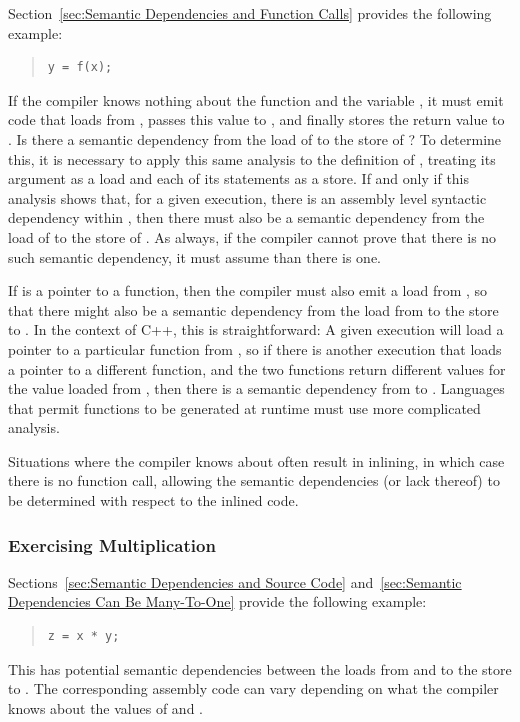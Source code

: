 Section~\ref{sec:Semantic Dependencies and Function Calls}
provides the following example:
\begin{quote}
\begin{verbatim}
y = f(x);
\end{verbatim}
\end{quote}
If the compiler knows nothing about the function  and the variable
, it must emit code that loads from , passes this value to
, and finally stores the return value to .
Is there a semantic dependency from the load of  to the store of
?
To determine this, it is necessary to apply this same analysis to the
definition of , treating its argument as a load and each of its
 statements as a store.
If and only if this analysis shows that, for a given execution, there
is an assembly level syntactic dependency within , then there
must also be a semantic dependency from the load of  to the store
of .
As always, if the compiler cannot prove that there is no such semantic
dependency, it must assume than there is one.

If  is a pointer to a function, then the compiler must also emit
a load from , so that there might also be a semantic dependency
from the load from  to the store to .
In the context of C++, this is straightforward:
A given execution will load a pointer to a particular function from
, so if there is another execution that loads a pointer to a
different function, and the two functions return different values for
the value loaded from , then there is a semantic dependency from
 to .
Languages that permit functions to be generated at runtime must use
more complicated analysis.

Situations where the compiler knows about  often result in
inlining, in which case there is no function call, allowing the semantic
dependencies (or lack thereof) to be determined with respect to the
inlined code.

\subsubsection{Exercising Multiplication}
\label{sec:Exercising Multiplication}

Sections~\ref{sec:Semantic Dependencies and Source Code}
and~\ref{sec:Semantic Dependencies Can Be Many-To-One}
provide the following example:
\begin{quote}
\begin{verbatim}
z = x * y;
\end{verbatim}
\end{quote}
This has potential semantic dependencies between the loads from 
and  to the store to .
The corresponding assembly code can vary depending on what the compiler
knows about the values of  and .

